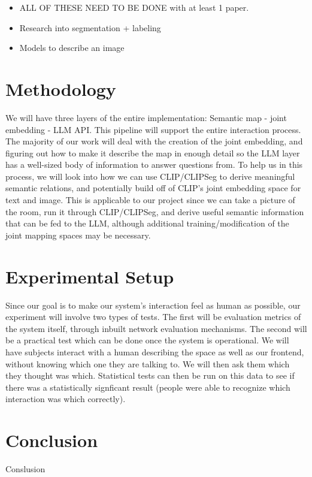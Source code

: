\documentclass[letterpaper, 10 pt, conference]{ieeeconf}  %
\begin{document}
\begin{itemize}
    
    \item ALL OF THESE NEED TO BE DONE with at least 1 paper.
    \item Research into segmentation + labeling
    \item Models to describe an image
\end{itemize}


\section{Methodology}
    We will have three layers of the entire implementation: Semantic map - joint embedding - LLM API. This pipeline will support the entire interaction process. The majority of our work will deal with the creation of the joint embedding, and figuring out how to make it describe the map in enough detail so the LLM layer has a well-sized body of information to answer questions from. To help us in this process, we will look into how we can use CLIP/CLIPSeg to derive meaningful semantic relations, and potentially build off of CLIP's joint embedding space for text and image. This is applicable to our project since we can take a picture of the room, run it through CLIP/CLIPSeg, and derive useful semantic information that can be fed to the LLM, although additional training/modification of the joint mapping spaces may be necessary.


\section{Experimental Setup}
    Since our goal is to make our system's interaction feel as human as possible, our experiment will involve two types of tests. The first will be evaluation metrics of the system itself, through inbuilt network evaluation mechanisms. The second will be a practical test which can be done once the system is operational. We will have subjects interact with a human describing the space as well as our frontend, without knowing which one they are talking to. We will then ask them which they thought was which. Statistical tests can then be run on this data to see if there was a statistically signficant result (people were able to recognize which interaction was which correctly).


\section{Conclusion}
Conslusion

%
%
\end{document}
